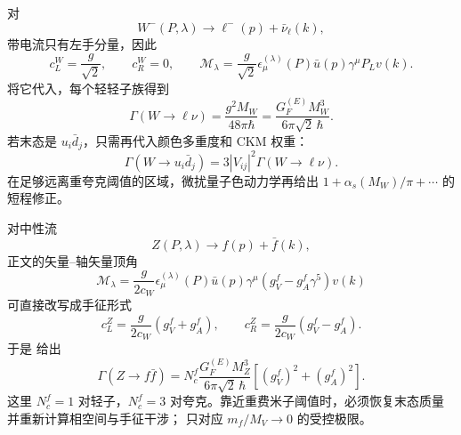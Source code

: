 对
\begin{equation*}
W^-(P,\lambda)\to\ell^-(p)+\bar\nu_\ell(k),
\end{equation*}
带电流只有左手分量，因此
\begin{equation}
 c_L^{W}=\frac{g}{\sqrt2},\qquad c_R^{W}=0,
 \qquad
 \mathcal M_\lambda
 =\frac{g}{\sqrt2}\epsilon_\mu^{(\lambda)}(P)
 \bar u(p)\gamma^\mu P_Lv(k).
 \label{eq:wlnu-amplitude-dp11}
\end{equation}
将它代入，每个轻轻子族得到
\begin{equation}
{
\Gamma(W\to\ell\nu)
=\frac{g^2M_W}{48\pi\hbar}
=\frac{G_F^{(E)}M_W^3}{6\pi\sqrt2\,\hbar}.}
\label{eq:w-leptonic-width-dp11}
\end{equation}
若末态是 $u_i\bar d_j$，只需再代入颜色多重度和 CKM 权重：
\begin{equation*}
\Gamma(W\to u_i\bar d_j)
=3|V_{ij}|^2\Gamma(W\to\ell\nu).
\end{equation*}
在足够远离重夸克阈值的区域，微扰量子色动力学再给出 $1+\alpha_s(M_W)/\pi+\cdots$ 的短程修正。

对中性流
\begin{equation*}
Z(P,\lambda)\to f(p)+\bar f(k),
\end{equation*}
正文的矢量--轴矢量顶角
\begin{equation}
\mathcal M_\lambda
=\frac{g}{2c_W}\epsilon_\mu^{(\lambda)}(P)
\bar u(p)\gamma^\mu(g_V^f-g_A^f\gamma^5)v(k)
\label{eq:zff-amplitude-width-dp11}
\end{equation}
可直接改写成手征形式
\begin{equation*}
 c_L^Z=\frac{g}{2c_W}(g_V^f+g_A^f),\qquad
 c_R^Z=\frac{g}{2c_W}(g_V^f-g_A^f).
\end{equation*}
于是 给出
\begin{equation}
{
\Gamma(Z\to f\bar f)
=N_c^f\frac{G_F^{(E)}M_Z^3}{6\pi\sqrt2\,\hbar}
\left[(g_V^f)^2+(g_A^f)^2\right].}
\label{eq:zff-width-tree-dp11}
\end{equation}
这里 $N_c^f=1$ 对轻子，$N_c^f=3$ 对夸克。靠近重费米子阈值时，必须恢复末态质量并重新计算相空间与手征干涉； 只对应 $m_f/M_V\to0$ 的受控极限。

